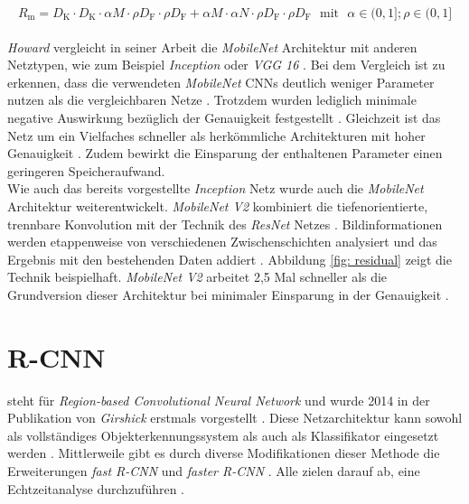 		\begin{equation}
			R_\text{m}=D_\text{K} \cdot D_\text{K} \cdot \alpha M \cdot \rho D_\text{F} \cdot \rho D_\text{F} + \alpha M \cdot \alpha N \cdot \rho D_\text{F} \cdot \rho D_\text{F} \text{  }\text{mit}\text{  } \alpha \in (0,1] ; \rho \in (0,1]
			\label{eq: rechenaufwand w}
		\end{equation}\\
	
		\textit{Howard} vergleicht in seiner Arbeit die \textit{MobileNet} Architektur mit anderen Netztypen, wie zum Beispiel \textit{Inception} oder \textit{VGG 16} \cite{mobilenets}. Bei dem Vergleich ist zu erkennen, dass die verwendeten \textit{MobileNet} CNNs deutlich weniger Parameter nutzen als die vergleichbaren Netze \cite{mobilenets}. Trotzdem wurden lediglich minimale negative Auswirkung bezüglich der Genauigkeit festgestellt \cite{mobilenets}. Gleichzeit ist das Netz um ein Vielfaches schneller als herkömmliche Architekturen mit hoher Genauigkeit \cite{mobilenets}. Zudem bewirkt die Einsparung der enthaltenen Parameter einen geringeren Speicheraufwand. \\
		
		Wie auch das bereits vorgestellte \textit{Inception} Netz wurde auch die \textit{MobileNet} Architektur weiterentwickelt. \textit{MobileNet V2} kombiniert die tiefenorientierte, trennbare Konvolution mit der Technik des \textit{ResNet} Netzes \cite{mobilenetv2}. Bildinformationen werden etappenweise von verschiedenen Zwischenschichten analysiert und das Ergebnis mit den bestehenden Daten addiert \cite{mobilenetv2}. Abbildung \ref{fig: residual} zeigt die Technik beispielhaft. \textit{MobileNet V2} arbeitet 2,5 Mal schneller als die Grundversion dieser Architektur bei minimaler Einsparung in der Genauigkeit \cite{mobilenetv2}.
		
	
		\section*{R-CNN}
		 steht für \textit{Region-based Convolutional Neural Network} und wurde 2014 in der Publikation von \textit{Girshick} erstmals vorgestellt \cite{rcnn}. Diese Netzarchitektur kann sowohl als vollständiges Objekterkennungssystem als auch als Klassifikator eingesetzt werden \cite{rcnn,rcnnarchitektur}. Mittlerweile gibt es durch diverse Modifikationen dieser Methode die Erweiterungen \textit{fast R-CNN} und \textit{faster R-CNN} \cite{fastrcnn,fasterrcnn}. Alle zielen darauf ab, eine Echtzeitanalyse durchzuführen \cite{fasterrcnn}.\\
		
